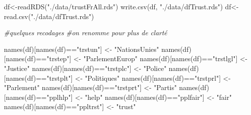 \documentclass[
]{book}
\newenvironment{Shaded}{\begin{snugshade}}{\end{snugshade}}
\newcommand{\CommentTok}[1]{\textcolor[rgb]{0.56,0.35,0.01}{\textit{#1}}}
\newcommand{\FunctionTok}[1]{\textcolor[rgb]{0.00,0.00,0.00}{#1}}
\newcommand{\NormalTok}[1]{#1}
\newcommand{\OtherTok}[1]{\textcolor[rgb]{0.56,0.35,0.01}{#1}}
\newcommand{\SpecialCharTok}[1]{\textcolor[rgb]{0.00,0.00,0.00}{#1}}
\newcommand{\StringTok}[1]{\textcolor[rgb]{0.31,0.60,0.02}{#1}}
\begin{document}
\begin{Shaded}
\begin{Highlighting}[]
\NormalTok{df}\OtherTok{\textless{}{-}}\FunctionTok{readRDS}\NormalTok{(}\StringTok{"./data/trustFrAll.rds"}\NormalTok{)}
\FunctionTok{write.csv}\NormalTok{(df, }\StringTok{"./data/dfTrust.rds"}\NormalTok{)}
\NormalTok{df}\OtherTok{\textless{}{-}}\FunctionTok{read.csv}\NormalTok{(}\StringTok{"./data/dfTrust.rds"}\NormalTok{)}

\CommentTok{\#quelques recodages}
\CommentTok{\#on renomme pour plus de clarté}

\FunctionTok{names}\NormalTok{(df)[}\FunctionTok{names}\NormalTok{(df)}\SpecialCharTok{==}\StringTok{"trstun"}\NormalTok{] }\OtherTok{\textless{}{-}} \StringTok{"NationsUnies"} 
\FunctionTok{names}\NormalTok{(df)[}\FunctionTok{names}\NormalTok{(df)}\SpecialCharTok{==}\StringTok{"trstep"}\NormalTok{] }\OtherTok{\textless{}{-}} \StringTok{"ParlementEurop"} 
\FunctionTok{names}\NormalTok{(df)[}\FunctionTok{names}\NormalTok{(df)}\SpecialCharTok{==}\StringTok{"trstlgl"}\NormalTok{] }\OtherTok{\textless{}{-}} \StringTok{"Justice"} 
\FunctionTok{names}\NormalTok{(df)[}\FunctionTok{names}\NormalTok{(df)}\SpecialCharTok{==}\StringTok{"trstplc"}\NormalTok{] }\OtherTok{\textless{}{-}} \StringTok{"Police"} 
\FunctionTok{names}\NormalTok{(df)[}\FunctionTok{names}\NormalTok{(df)}\SpecialCharTok{==}\StringTok{"trstplt"}\NormalTok{] }\OtherTok{\textless{}{-}} \StringTok{"Politiques"} 
\FunctionTok{names}\NormalTok{(df)[}\FunctionTok{names}\NormalTok{(df)}\SpecialCharTok{==}\StringTok{"trstprl"}\NormalTok{] }\OtherTok{\textless{}{-}}\StringTok{"Parlement"} 
\FunctionTok{names}\NormalTok{(df)[}\FunctionTok{names}\NormalTok{(df)}\SpecialCharTok{==}\StringTok{"trstprt"}\NormalTok{] }\OtherTok{\textless{}{-}} \StringTok{"Partis"}
\FunctionTok{names}\NormalTok{(df)[}\FunctionTok{names}\NormalTok{(df)}\SpecialCharTok{==}\StringTok{"pplhlp"}\NormalTok{] }\OtherTok{\textless{}{-}} \StringTok{"help"}
\FunctionTok{names}\NormalTok{(df)[}\FunctionTok{names}\NormalTok{(df)}\SpecialCharTok{==}\StringTok{"pplfair"}\NormalTok{] }\OtherTok{\textless{}{-}} \StringTok{"fair"}
\FunctionTok{names}\NormalTok{(df)[}\FunctionTok{names}\NormalTok{(df)}\SpecialCharTok{==}\StringTok{"ppltrst"}\NormalTok{] }\OtherTok{\textless{}{-}} \StringTok{"trust"}


\end{Highlighting}
\end{Shaded}
\end{document}
